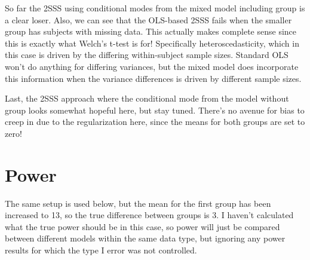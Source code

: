 \documentclass[
]{book}
\begin{document}
So far the 2SSS using conditional modes from the mixed model including group is a clear loser. Also, we can see that the OLS-based 2SSS fails when the smaller group has subjects with missing data. This actually makes complete sense since this is exactly what Welch's t-test is for! Specifically heteroscedasticity, which in this case is driven by the differing within-subject sample sizes. Standard OLS won't do anything for differing variances, but the mixed model does incorporate this information when the variance differences is driven by different sample sizes.

Last, the 2SSS approach where the conditional mode from the model without group looks somewhat hopeful here, but stay tuned. There's no avenue for bias to creep in due to the regularization here, since the means for both groups are set to zero!

\hypertarget{power}{%
\section{Power}\label{power}}

The same setup is used below, but the mean for the first group has been increased to 13, so the true difference between groups is 3. I haven't calculated what the true power should be in this case, so power will just be compared between different models within the same data type, but ignoring any power results for which the type I error was not controlled.
\end{document}

